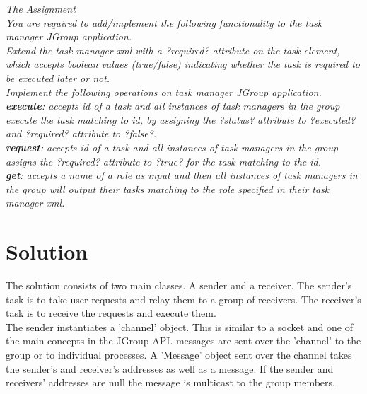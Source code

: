 \textit{The Assignment}\\

\textit{You are required to add/implement the following functionality to the task manager JGroup application.}\\

\textit{Extend the task manager xml with a ?required? attribute on the task element, which accepts boolean values (true/false) indicating whether the task is required to be executed later or not.}\\

\textit{Implement the following operations on task manager JGroup application.}\\

\textit{\textbf{execute}: accepts id of a task and all instances of task managers in the group execute the task matching to id, by assigning the ?status? attribute to ?executed? and ?required? attribute to ?false?.}\\

\textit{\textbf{request}: accepts id of a task and  all instances of task managers in the group assigns the ?required? attribute to ?true? for the task matching to the id.}\\

\textit{\textbf{get}: accepts a name of a role as input and then all instances of task managers in the group will output their tasks matching to the role specified in their task manager xml.}\\




\section{Solution}
\label{jgroup_solution}

The solution consists of two main classes. A sender and a receiver. The sender's task is to take user requests and relay them to a group of receivers.
The receiver's task is to receive the requests and execute them. \\ 

The sender instantiates a 'channel' object. This is similar to a socket and one of the main concepts in the JGroup API. messages are sent over the 'channel' to the group or to individual processes.  A 'Message' object sent over the channel takes the sender's and receiver's addresses as well as a message. If the sender and receivers' addresses are null the message is multicast to the group members.\\

